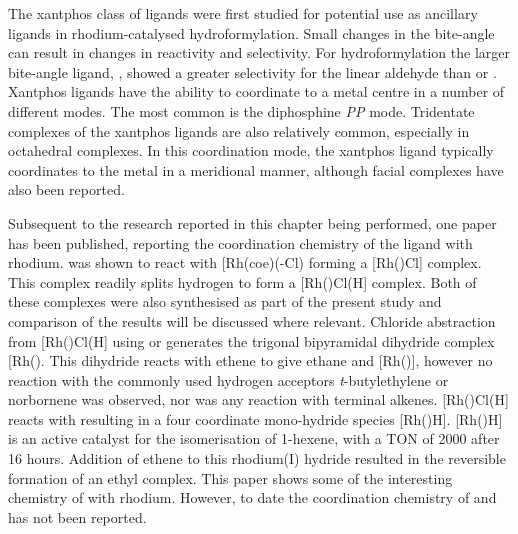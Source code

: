 
The xantphos class of ligands were first studied for potential use as ancillary ligands in rhodium-catalysed hydroformylation\cite{Kranenburg1995}.  Small changes in the bite-angle can result in changes in reactivity and selectivity.  For hydroformylation the larger bite-angle ligand, \Phxantphos{}, showed a greater selectivity for the linear aldehyde than \Phsixantphos{} or \Phthixantphos{}.  Xantphos ligands have the ability to coordinate to a metal centre in a number of different modes.  The most common is the diphosphine \dento{}\emph{PP\textprime} mode.  Tridentate \POP{} complexes of the xantphos ligands are also relatively common, especially in octahedral complexes.  In this \POP{} coordination mode, the xantphos ligand typically coordinates to the metal in a meridional manner, although facial complexes have also been reported.\cite{Dallanegra2012, Pawley2012}  

Subsequent to the research reported in this chapter being performed, one paper has been published, reporting the coordination chemistry of the \tBuxantphos{} ligand with rhodium.\cite{Haibach2013}  \tBuXantphos{} was shown to react with [Rh(coe)(\hapto{}-Cl)\ce{]2} forming a [Rh(\tBuxantphosk)Cl] complex.  This complex readily splits hydrogen to form a [Rh(\tBuxantphosk)Cl(H] complex.  Both of these complexes were also synthesised as part of the present study and comparison of the results will be discussed where relevant.  Chloride abstraction from  [Rh(\tBuxantphosk)Cl(H] using  or  generates the trigonal bipyramidal dihydride complex [Rh(\tBuxantphosk)\ce{(H)2]+}.  This dihydride reacts with ethene to give ethane and [Rh(\tBuxantphosk)], however no reaction with the commonly used hydrogen acceptors \emph{t}-butylethylene or norbornene was observed, nor was any reaction with terminal alkenes.  [Rh(\tBuxantphosk)Cl(H] reacts with  resulting in a four coordinate mono-hydride species [Rh(\tBuxantphos)H].  [Rh(\tBuxantphos)H] is an active catalyst for the isomerisation of 1-hexene, with a TON of 2000 after 16 hours.  Addition of ethene to this rhodium(I) hydride resulted in the reversible formation of an ethyl complex.  This paper shows some of the interesting chemistry of \tBuxantphos{} with rhodium.  However, to date the coordination chemistry of \tBusixantphos{} and \tButhixantphos{} has not been reported.  

